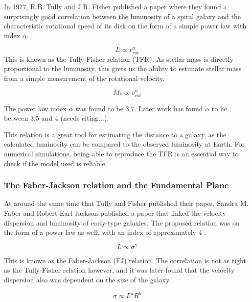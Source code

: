In 1977, R.B. Tully and J.R. Fisher \parencite{TullyFisher1977} published a paper where they found a surprisingly good correlation between the luminosity of a spiral galaxy and the characteristic rotational speed of its disk on the form of a simple power law with index $\alpha$.

\begin{equation}
    L \propto v_{rot}^\alpha
\end{equation}
This is known as the Tully-Fisher relation (TFR). As stellar mass is directly proportional to the luminosity, this gives us the ability to estimate stellar mass from a simple measurement of the rotational velocity.

\begin{equation}
    M_* \propto v_{rot}^\alpha 
\end{equation}

The power law index $\alpha$ was found to be 3.7. Later work has found $\alpha$ to lie between 3.5 and 4 (needs citing...).


This relation is a great tool for estimating the distance to a galaxy, as the calculated luminosity can be compared to the observed luminosity at Earth. For numerical simulations, being able to reproduce the TFR is an essential way to check if the model used is reliable.

\subsubsection{The Faber-Jackson relation and the Fundamental Plane}
At around the same time that Tully and Fisher published their paper, Sandra M. Faber and Robert Earl Jackson published a paper that linked the velocity dispersion and luminosity of early-type galaxies. The proposed relation was on the form of a power law as well, with an index of approximately 4 \parencite{FaberJackson1976}.

\begin{equation}
    L \propto \sigma^{\gamma} 
\end{equation}

This is known as the Faber-Jackson (FJ) relation. The correlation is not as tight as the Tully-Fisher relation however, and it was later found that the velocity dispersion also was dependent on the size of the galaxy.

\begin{equation}
    \sigma \propto L^a R^b
\end{equation}

